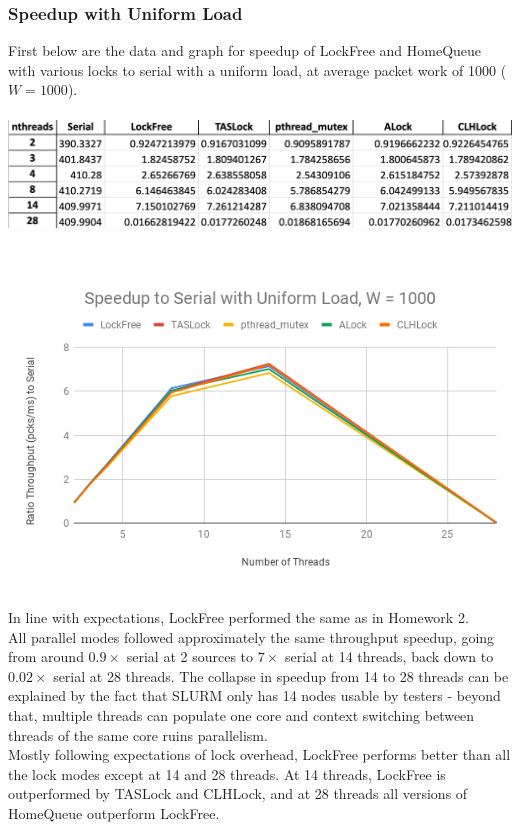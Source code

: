 \documentclass{article}
\begin{document}
\begin{adjustwidth}{-2cm}{-2cm}
\subsubsection{Speedup with Uniform Load}
First below are the data and graph for speedup of LockFree and HomeQueue with various locks to serial with a uniform load, at average packet work of 1000 ($W = 1000$).\\
\null\\
\includegraphics[width=\linewidth]{b_uni1000Data.png}\\ \null\\
\null\\
\includegraphics[width=\linewidth]{b_uni1000Graph.png}\\ \null\\
In line with expectations, LockFree performed the same as in Homework 2.\\
All parallel modes followed approximately the same throughput speedup, going from around $0.9\times$ serial at 2 sources to $7\times$ serial at 14 threads, back down to $0.02\times$ serial at 28 threads. The collapse in speedup from 14 to 28 threads can be explained by the fact that SLURM only has 14 nodes usable by testers - beyond that, multiple threads can populate one core and context switching between threads of the same core ruins parallelism.\\
Mostly following expectations of lock overhead, LockFree performs better than all the lock modes except at 14 and 28 threads. At 14 threads, LockFree is outperformed by TASLock and CLHLock, and at 28 threads all versions of HomeQueue outperform LockFree.\\

\end{adjustwidth}
\end{document}
